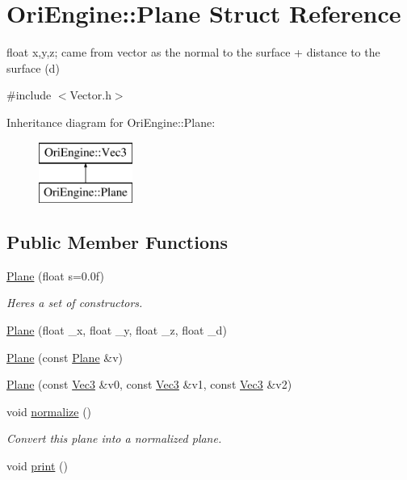 \hypertarget{struct_ori_engine_1_1_plane}{}\section{Ori\+Engine\+:\+:Plane Struct Reference}
\label{struct_ori_engine_1_1_plane}


float x,y,z; came from vector as the normal to the surface + distance to the surface (d)  




{\ttfamily \#include $<$Vector.\+h$>$}

Inheritance diagram for Ori\+Engine\+:\+:Plane\+:\begin{figure}[H]
\begin{center}
\leavevmode
\includegraphics[height=2.000000cm]{struct_ori_engine_1_1_plane}
\end{center}
\end{figure}
\subsection*{Public Member Functions}
\begin{DoxyCompactItemize}
\item 
\hyperlink{struct_ori_engine_1_1_plane_a94deefa0a982b77ea7ad882337e06b84}{Plane} (float s=0.\+0f)
\begin{DoxyCompactList}\small\item\em Here\textquotesingle{}s a set of constructors. \end{DoxyCompactList}\item 
\hyperlink{struct_ori_engine_1_1_plane_afdd998df2694dd0861a9c5f352125a04}{Plane} (float \+\_\+x, float \+\_\+y, float \+\_\+z, float \+\_\+d)
\item 
\hyperlink{struct_ori_engine_1_1_plane_ac25785437dcaacb2adb0b3667cf78fda}{Plane} (const \hyperlink{struct_ori_engine_1_1_plane}{Plane} \&v)
\item 
\hyperlink{struct_ori_engine_1_1_plane_abffb56ba7a6f9824664be9037ebbec8c}{Plane} (const \hyperlink{struct_ori_engine_1_1_vec3}{Vec3} \&v0, const \hyperlink{struct_ori_engine_1_1_vec3}{Vec3} \&v1, const \hyperlink{struct_ori_engine_1_1_vec3}{Vec3} \&v2)
\item 
void \hyperlink{struct_ori_engine_1_1_plane_af61832e1aeaff5074e9fd035ac5b8fa4}{normalize} ()
\begin{DoxyCompactList}\small\item\em Convert this plane into a normalized plane. \end{DoxyCompactList}\item 
void \hyperlink{struct_ori_engine_1_1_plane_a607d6de04c3f0c5ea9b06cc1397f3227}{print} ()
\end{DoxyCompactItemize}
